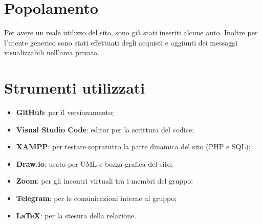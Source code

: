 \appendix
    \section{Popolamento}
    Per avere un reale utilizzo del sito, sono già stati inseriti alcune auto. Inoltre per l'utente generico sono stati effettuati degli acquisti e aggiunti dei messaggi visualizzabili nell'area privata.

    \section{Strumenti utilizzati}
    \begin{itemize}
        \item \textbf{GitHub}: per il versionamento; 
        \item \textbf{Visual Studio Code}: editor per la scrittura del codice; 
        \item \textbf{XAMPP}: per testare sopratutto la parte dinamica del sito (PHP e SQL);
        \item \textbf{Draw.io}: usato per UML e bozza grafica del sito;
        \item \textbf{Zoom}: per gli incontri virtuali tra i membri del gruppo;
        \item \textbf{Telegram}: per le comunicazioni interne al gruppo;
        \item \textbf{\LaTeX}: per la stesura della relazione.
    \end{itemize}
\pagebreak